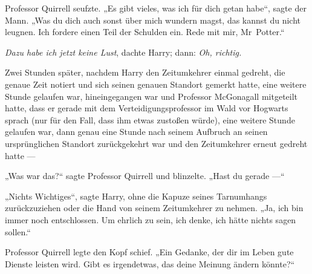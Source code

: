 Professor Quirrell seufzte.
„Es gibt vieles, was ich für dich getan habe“, sagte der Mann.
„Was du dich auch sonst über mich wundern magst, das kannst du nicht leugnen. Ich fordere einen Teil der Schulden ein. Rede mit mir, Mr~Potter.“

\emph{Dazu habe ich jetzt keine Lust}, dachte Harry; dann: \emph{Oh, richtig.}

\later

Zwei Stunden später, nachdem Harry den Zeitumkehrer einmal gedreht, die genaue Zeit notiert und sich seinen genauen Standort gemerkt hatte, eine weitere Stunde gelaufen war, hineingegangen war und Professor McGonagall mitgeteilt hatte, dass er gerade mit dem Verteidigungsprofessor im Wald vor Hogwarts sprach (nur für den Fall, dass ihm etwas zustoßen würde), eine weitere Stunde gelaufen war, dann genau eine Stunde nach seinem Aufbruch an seinen ursprünglichen Standort zurückgekehrt war und den Zeitumkehrer erneut gedreht hatte —

\later

„Was war das?“ sagte Professor Quirrell und blinzelte.
„Hast du gerade —“

„Nichts Wichtiges“, sagte Harry, ohne die Kapuze seines Tarnumhangs zurückzuziehen oder die Hand von seinem Zeitumkehrer zu nehmen.
„Ja, ich bin immer noch entschlossen. Um ehrlich zu sein, ich denke, ich hätte nichts sagen sollen.“

Professor Quirrell legte den Kopf schief.
„Ein Gedanke, der dir im Leben gute Dienste leisten wird. Gibt es irgendetwas, das deine Meinung ändern könnte?“

